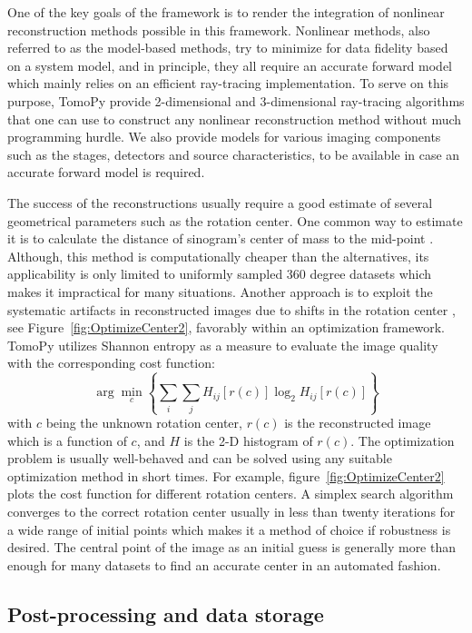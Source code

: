 \documentclass[pdf]{iucr}              %
\begin{document}
One of the key goals of the framework is to render the integration of nonlinear reconstruction methods possible in this framework. Nonlinear methods, also referred to as the model-based methods, try to minimize for data fidelity based on a system model, and in principle, they all require an accurate forward model which mainly relies on an efficient ray-tracing implementation. To serve on this purpose, TomoPy provide 2-dimensional and 3-dimensional ray-tracing algorithms that one can use to construct any nonlinear reconstruction method without much programming hurdle. We also provide models for various imaging components such as the stages, detectors and source characteristics, to be available in case an accurate forward model is required. 

The success of the reconstructions usually require a good estimate of several geometrical parameters such as the rotation center. One common way to estimate it is to calculate the distance of sinogram's center of mass to the mid-point \cite{Azevedo}. Although, this method is computationally cheaper than the alternatives, its applicability is only limited to uniformly sampled 360 degree datasets which makes it impractical for many situations. Another approach is to exploit the systematic artifacts in reconstructed images due to shifts in the rotation center \cite{donath_spie_2006}, see Figure~\ref{fig:OptimizeCenter2}, favorably within an optimization framework. TomoPy utilizes Shannon entropy as a measure to evaluate the image quality with the corresponding cost function:
\begin{equation}
\arg \min_c \left\{\sum_i \sum_jH_{ij}\left[r(c)\right]\log_2 H_{ij}\left[r(c)\right]\right\}
\end{equation}
with $c$ being the unknown rotation center, $r(c)$ is the reconstructed image which is a function of $c$, and $H$ is the 2-D histogram of $r(c)$. The optimization problem is usually well-behaved and can be solved using any suitable optimization method in short times. For example, figure~\ref{fig:OptimizeCenter2} plots the cost function for different rotation centers. A simplex search algorithm converges to the correct rotation center usually in less than twenty iterations for a wide range of initial points which makes it a method of choice if robustness is desired. The central point of the image as an initial guess is generally more than enough for many datasets to find an accurate center in an automated fashion.

\subsection{Post-processing and data storage}
\end{document}
